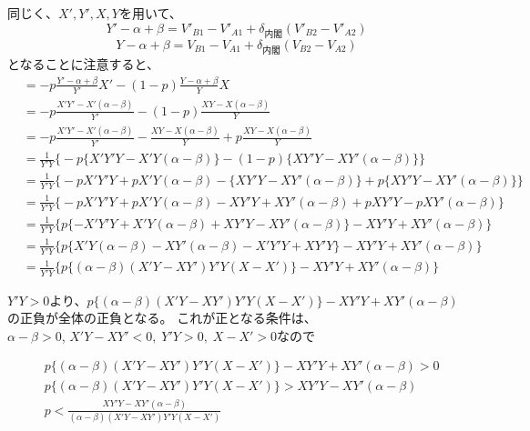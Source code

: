 \documentclass[main.tex]{subfiles}
\begin{document}
同じく、$X', Y', X, Y$を用いて、
$$Y' -\alpha + \beta = V'_{B1}-V'_{A1} + \delta_{内閣}(V'_{B2} - V'_{A2})$$
$$Y  -\alpha + \beta = V_{B1}-V_{A1} + \delta_{内閣}(V_{B2} - V_{A2})$$
となることに注意すると、
\begin{align*}
    &= -p \frac{ Y' -\alpha + \beta }{ Y' } X'  -    (1-p) \frac{ Y  -\alpha + \beta }{ Y }X\\[0.5em]
    &= -p \frac{ X'Y' - X'(\alpha - \beta) }{ Y'}   -    (1-p) \frac{ XY - X(\alpha - \beta) }{ Y }\\[0.5em]
    &= -p \frac{ X'Y' - X'(\alpha - \beta) }{ Y'}   -   \frac{ XY - X(\alpha - \beta) }{ Y } + p\frac{ XY - X(\alpha - \beta) }{ Y }\\[0.5em]
    &= \frac{1}{Y'Y} \Big\{ -p \{ X'Y'Y - X'Y(\alpha - \beta) \}   -    (1-p) \{ XY'Y - XY'(\alpha - \beta)\} \Big\} \\[0.5em]
    &= \frac{1}{Y'Y} \Big\{ -p X'Y'Y +p X'Y(\alpha - \beta)   -    \{XY'Y - XY'(\alpha - \beta)\} + p\{XY'Y - XY'(\alpha - \beta)\} \Big\} \\[0.5em]
    &= \frac{1}{Y'Y} \Big\{ -p X'Y'Y +p X'Y(\alpha - \beta)   -    XY'Y + XY'(\alpha - \beta) + pXY'Y - pXY'(\alpha - \beta) \Big\} \\[0.5em]
    &= \frac{1}{Y'Y} \Big\{ p \{  - X'Y'Y + X'Y(\alpha - \beta)    + XY'Y - XY'(\alpha - \beta) \} -XY'Y + XY'(\alpha - \beta) \Big\} \\[0.5em]
    &= \frac{1}{Y'Y} \Big\{ p \{ X'Y(\alpha - \beta) - XY'(\alpha - \beta) - X'Y'Y + XY'Y  \} -XY'Y + XY'(\alpha - \beta) \Big\} \\[0.5em]
    &= \frac{1}{Y'Y} \Big\{ p \{ (\alpha - \beta)( X'Y- XY')Y'Y(X - X')  \} -XY'Y + XY'(\alpha - \beta) \Big\} 
\end{align*}

$Y'Y>0$より、$p \{ (\alpha - \beta)( X'Y- XY')Y'Y(X - X')  \} -XY'Y + XY'(\alpha - \beta)$の正負が全体の正負となる。
これが正となる条件は、\\
$\alpha - \beta > 0$, $X'Y - XY' < 0,\; Y'Y > 0,\; X - X' > 0$なので

\begin{align*}
    &p \{ (\alpha - \beta)( X'Y- XY')Y'Y(X - X')  \} -XY'Y + XY'(\alpha - \beta) > 0\\[1em]
    &p \{ (\alpha - \beta)( X'Y- XY')Y'Y(X - X')  \} > XY'Y - XY'(\alpha - \beta)  \\[1em]
    &p  < \frac{XY'Y - XY'(\alpha - \beta)}{ (\alpha - \beta)( X'Y- XY')Y'Y(X - X') }  \\[1em]
\end{align*}
\end{document}
